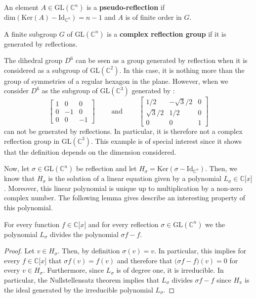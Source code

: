 \documentclass[envcountsame,envcountchap]{svmono}
\newcommand{\C}{\mathbb C}
\newcommand{\tg}[1]{\textbf{#1}}
\newcommand{\lb}{\lbrack}
\newcommand{\rb}{\rbrack}
\newcommand{\q}{\quad}
\begin{document}
\begin{definition}
	An element $A\in\mbox{GL}(\C^n)$ is a \tg{pseudo-reflection} if $\mbox{dim}(\mbox{Ker}(A)-\mbox{Id}_{\C^n})=n-1$ and $A$ is of finite order in $G$.
\end{definition}

\begin{definition}
	A finite subgroup $G$ of $\mbox{GL}(\C^n)$ is a \tg{complex reflection group} if it is generated by reflections.
\end{definition}

\begin{example}
	The dihedral group $D^6$ can be seen as a group generated by reflection when it is considered as a subgroup of $\mbox{GL}(\C^2)$. In this case, it is nothing more than the group of symmetries of a regular hexagon in the plane. However, when we consider $D^6$ as the subgroup of $\mbox{GL}(\C^3)$ generated by :
	\begin{equation*}
	\begin{bmatrix}
	1     & 0 & 0  \\
	0     & -1 & 0  \\
	0      & 0 & -1 
	\end{bmatrix}\q\q \mbox{ and }\q\q 	\begin{bmatrix}
	1/2   & -\sqrt{3}/2 & 0  \\
	\sqrt{3}/2    & 1/2 & 0  \\
	0      & 0 & 1 
	\end{bmatrix}
	\end{equation*}
	can not be generated by reflections. In particular, it is therefore not a complex reflection group in $\mbox{GL}(\C^3)$. This example is of special interest since it shows that the definition depends on the dimension considered.
\end{example}

Now, let $\sigma\in \mbox{GL}(\C^n)$ be  reflection and let $H_\sigma=\mbox{Ker}(\sigma -\mbox{Id}_{\C^n})$. Then, we know that $H_\sigma$ is the solution of a linear equation given by a polynomial $L_\sigma\in \C\lb x\rb$. Moreover, this linear polynomial is unique up to multiplication by a non-zero complex number. The following lemma gives describe an interesting property of this polynomial.

\begin{lemma}
	For every function $f\in \C\lb x\rb$ and for every reflection $\sigma\in \mbox{GL}(\C^n)$ we the polynomial $L_\sigma$ divides the polynomial $\sigma f -f $.
\end{lemma}
\begin{proof}
	Let $v\in H_\sigma$. Then, by definition $\sigma (v)=v$. In particular, this implies for every $f\in \C \lb x\rb$ that $\sigma f(v)=f(v)$ and therefore that $\big(\sigma f-f\big)(v)=0$ for every $v\in H_\sigma$. Furthermore, since $L_\sigma$ is of degree one, it is irreducible. In particular, the Nullstellensatz theorem implies that $L_\sigma$ divides $\sigma f -f$ since $H_\pi$ is the ideal generated by the irreducible polynomial $L_\sigma$.
\end{proof}
\end{document}
